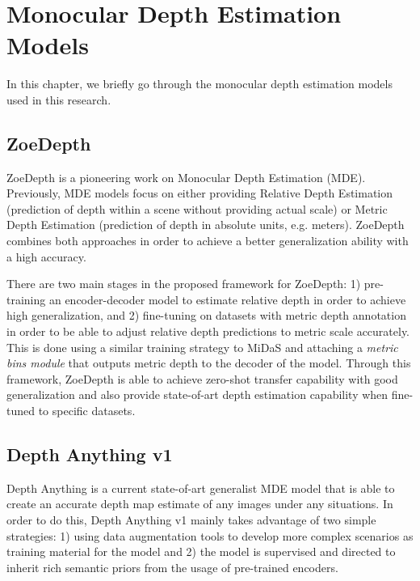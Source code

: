 
\chapter{Monocular Depth Estimation Models}\label{chapter:monocular_models}


In this chapter, we briefly go through the monocular depth estimation models used in this research.

\section{ZoeDepth}
ZoeDepth \parencite{ZoeDepth} is a pioneering work on Monocular Depth Estimation (MDE). Previously, MDE models focus on either providing Relative Depth Estimation (prediction of depth within a scene without providing actual scale) or Metric Depth Estimation (prediction of depth in absolute units, e.g. meters). ZoeDepth combines both approaches in order to achieve a better generalization ability with a high accuracy.

There are two main stages in the proposed framework for ZoeDepth: 1) pre-training an encoder-decoder model to estimate relative depth in order to achieve high generalization, and 2) fine-tuning on datasets with metric depth annotation in order to be able to adjust relative depth predictions to metric scale accurately. This is done using a similar training strategy to MiDaS \parencite{Midas} and attaching a \textit{metric bins module} that outputs metric depth to the decoder of the model. Through this framework, ZoeDepth is able to achieve zero-shot transfer capability with good generalization and also provide state-of-art depth estimation capability when fine-tuned to specific datasets.

\section{Depth Anything v1}
Depth Anything \parencite{DepthAnythingV1} is a current state-of-art generalist MDE model that is able to create an accurate depth map estimate of any images under any situations.  In order to do this, Depth Anything v1 mainly takes advantage of two simple strategies: 1) using data augmentation tools to develop more complex scenarios as training material for the model and 2) the model is supervised and directed to inherit rich semantic priors from the usage of pre-trained encoders.

